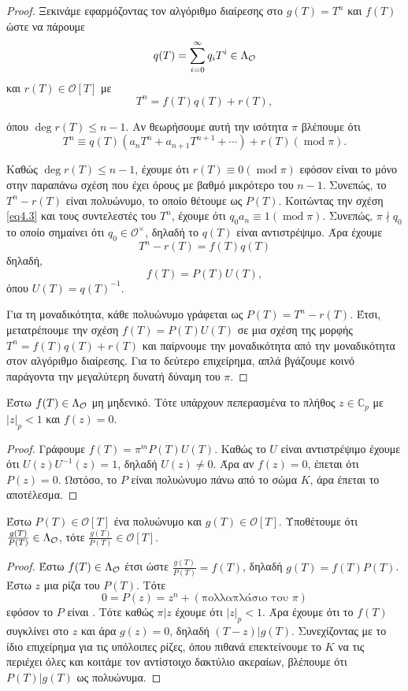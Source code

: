 \begin{proof} Ξεκινάμε εφαρμόζοντας τον αλγόριθμο διαίρεσης στο $g(T) = T^n$ και $f(T)$ ώστε να πάρουμε 
	$$q(T) = \sum\limits_{i=0}^\infty q_i T^i \in \Lambda_\mathcal{O}$$
	και $r(T) \in \mathcal{O}[T]$ με 
	\begin{equation}
		\label{eq4.3}
		T^n = f(T)q(T) + r(T),
	\end{equation}

	\noindent όπου $\deg r(T) \leq n-1$. Αν θεωρήσουμε αυτή την ισότητα  $\pi$ βλέπουμε ότι 
	$$T^n \equiv q(T) (a_nT^n + a_{n+1}T^{n+1} + \cdots ) + r(T) (\operatorname{mod}\pi).$$

	\noindent Καθώς $\deg r(T)\leq n-1$, έχουμε ότι $r(T)\equiv 0 (\operatorname{mod}\pi)$ εφόσον είναι το μόνο στην παραπάνω σχέση που 
	έχει όρους με βαθμό μικρότερο του $n-1$. Συνεπώς, το $T^n-r(T)$ είναι  πολυώνυμο, το οποίο θέτουμε ως $P(T)$. Κοιτώντας την σχέση 
	\ref{eq4.3} και τους συντελεστές του $T^n$, έχουμε ότι $q_0 a_n\equiv 1 (\operatorname{mod}\pi)$. Συνεπώς, $\pi \nmid q_0$ το οποίο σημαίνει ότι 
	$q_0 \in \mathcal{O}^\times$, δηλαδή το $q(T)$ είναι αντιστρέψιμο. Άρα έχουμε
	$$T^n -r(T) = f(T)q(T)$$
	δηλαδή,
	$$f(T) = P(T)U(T),$$ όπου $U(T) = q(T)^{-1}$.

	Για τη μοναδικότητα, κάθε  πολυώνυμο γράφεται ως $P(T) = T^n - r(T)$. Έτσι, μετατρέπουμε την σχέση $f(T) = P(T) U(T)$ σε μια σχέση της μορφής $T^n = f(T)q(T)+r(T)$ και παίρνουμε την μοναδικότητα από την μοναδικότητα στον αλγόριθμο διαίρεσης. Για το δεύτερο επιχείρημα, απλά βγάζουμε κοινό παράγοντα την μεγαλύτερη δυνατή δύναμη του $\pi$.
\end{proof}


\begin{cor} Έστω $f(T) \in \Lambda_\mathcal{O}$ μη μηδενικό. Τότε υπάρχουν πεπερασμένα το πλήθος $z \in \mathbb{C}_p$ με $|z|_p < 1$ και $f(z) = 0$.
\end{cor}

\begin{proof}
	Γράφουμε $f(T) = \pi^m P(T)U(T)$. Καθώς το $U$ είναι αντιστρέψιμο έχουμε ότι $U(z)U^{-1}(z)=1$, δηλαδή $U(z)\neq 0$. Άρα αν $f(z)=0$, έπεται ότι $P(z)=0$. Ωστόσο, το $P$ είναι πολυώνυμο πάνω από το σώμα $K$, άρα έπεται το αποτέλεσμα.
\end{proof}

\begin{lemma} Έστω $P(T)\in \mathcal{O}[T]$ ένα  πολυώνυμο και $g(T) \in \mathcal{O}[T]$. Υποθέτουμε ότι $\frac{g(T)}{P(T)} \in \Lambda_\mathcal{O}$, τότε $\frac{g(T)}{P(T)} \in \mathcal{O}[T]$.
\end{lemma}

\begin{proof}
	Έστω $f(T) \in \Lambda_\mathcal{O}$ έτσι ώστε $\frac{g(T)}{P(T)} = f(T)$, δηλαδή $g(T) = f(T)P(T)$. Έστω $z$ μια ρίζα του $P(T)$. Τότε
	$$0 = P(z) =z^n + (\text{πολλαπλάσιο του } \pi)$$
	εφόσον το $P$ είναι . Τότε καθώς $\pi | z$ έχουμε ότι $|z|_p < 1$. Άρα έχουμε ότι το $f(T)$ συγκλίνει στο $z$ και άρα $g(z) = 0$, δηλαδή $(T-z)|g(T)$. Συνεχίζοντας με το ίδιο επιχείρημα για τις υπόλοιπες ρίζες, όπου πιθανά επεκτείνουμε το $K$ να τις περιέχει όλες και κοιτάμε τον αντίστοιχο δακτύλιο ακεραίων, βλέπουμε ότι $P(T)|g(T)$ ως πολυώνυμα.
\end{proof}